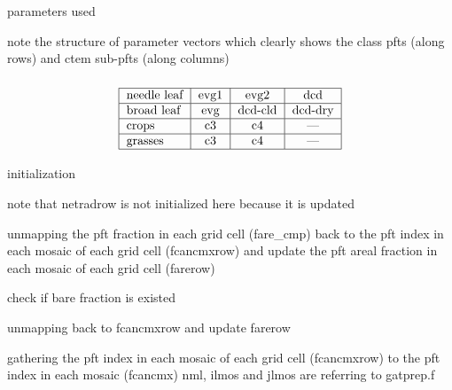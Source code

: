  parameters used

note the structure of parameter vectors which clearly shows the class pfts (along rows) and ctem sub-\/pfts (along columns) \subsubsection*{\[ \begin{tabular} { | l | c | c | c | } \hline needle leaf & evg1 & evg2 & dcd \\ \hline broad leaf & evg & dcd-cld & dcd-dry \\ \hline crops & c3 & c4 & --- \\ \hline grasses & c3 & c4 & --- \\ \hline \end{tabular} \] }

initialization

note that netradrow is not initialized here because it is updated

unmapping the pft fraction in each grid cell (fare\+\_\+cmp) back to the pft index in each mosaic of each grid cell (fcancmxrow) and update the pft areal fraction in each mosaic of each grid cell (farerow)

check if bare fraction is existed

unmapping back to fcancmxrow and update farerow

gathering the pft index in each mosaic of each grid cell (fcancmxrow) to the pft index in each mosaic (fcancmx) nml, ilmos and jlmos are referring to gatprep.\+f
